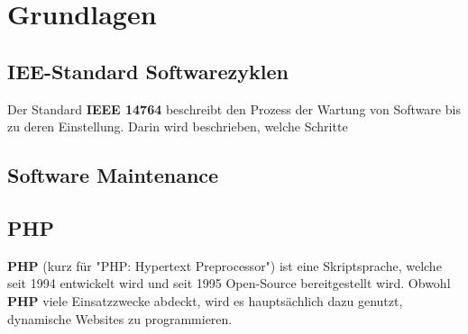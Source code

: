 \chapter{Grundlagen}\label{ch:grundlagen}

\section{IEE-Standard Softwarezyklen}
Der Standard \textbf{IEEE 14764} beschreibt den Prozess der Wartung von Software bis zu deren Einstellung.
Darin wird beschrieben, welche Schritte 

\section{Software Maintenance}

\section{PHP}
\textbf{PHP} (kurz für "PHP: Hypertext Preprocessor") ist eine Skriptsprache, welche seit 1994 entwickelt wird und seit 1995 Open-Source bereitgestellt wird.
Obwohl \textbf{PHP} viele Einsatzzwecke abdeckt, wird es hauptsächlich dazu genutzt, dynamische Websites zu programmieren.
